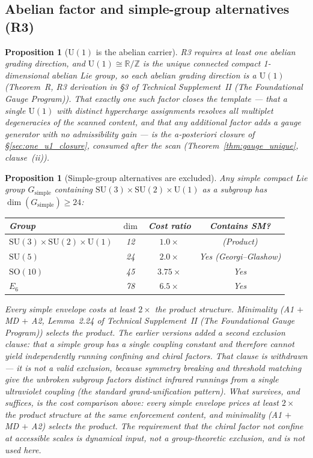 \documentclass[11pt]{article}
\newtheorem{proposition}[theorem]{Proposition}
\theoremstyle{definition}
\newcommand{\SU}{\mathrm{SU}}
\newcommand{\U}{\mathrm{U}}
\newcommand{\TSII}{Technical Supplement~II (\emph{The Foundational Gauge Program})}
\begin{document}
\subsection{Abelian factor and simple-group alternatives (R3)}
\label{sec:R3_simple}

\begin{proposition}[$\U(1)$ is the abelian carrier]\label{prop:R3_unique}
R3 requires at least one abelian grading direction, and
$\U(1) \cong \mathbb{R}/\mathbb{Z}$ is the unique connected compact
1-dimensional abelian Lie group, so each abelian grading direction is
a $\U(1)$ (Theorem~R, R3 derivation in \S3 of \TSII{}).  That
\emph{exactly one} such factor closes the template --- that a single
$\U(1)$ with distinct hypercharge assignments resolves all multiplet
degeneracies of the scanned content, and that any additional factor
adds a gauge generator with no admissibility gain --- is the
a-posteriori closure of \S\ref{sec:one_u1_closure}, consumed after
the scan (Theorem~\ref{thm:gauge_unique}, clause~(ii)).
\end{proposition}

\begin{proposition}[Simple-group alternatives are excluded]\label{prop:no_simple}
Any simple compact Lie group $G_{\mathrm{simple}}$ containing
$\SU(3) \times \SU(2) \times \U(1)$ as a subgroup has
$\dim(G_{\mathrm{simple}}) \ge 24$:

\smallskip
\begin{center}
\small
\begin{tabular}{@{}lccc@{}}
\toprule
\textbf{Group} & $\dim$ & \textbf{Cost ratio} & \textbf{Contains SM?} \\
\midrule
$\SU(3) \times \SU(2) \times \U(1)$ & 12 & $1.0\times$ & (Product) \\
$\SU(5)$   & 24 & $2.0\times$ & Yes (Georgi--Glashow) \\
$\mathrm{SO}(10)$ & 45 & $3.75\times$ & Yes \\
$E_6$ & 78 & $6.5\times$ & Yes \\
\bottomrule
\end{tabular}
\end{center}

\smallskip\noindent Every simple envelope costs at least $2\times$ the
product structure.  Minimality (A1 $+$ MD $+$ A2,
Lemma~2.24 of \TSII{}) selects the product.
The earlier versions added a second exclusion clause: that a simple
group has a single coupling constant and therefore cannot yield
independently running confining and chiral factors.  That clause is
withdrawn --- it is not a valid exclusion, because symmetry breaking
and threshold matching give the unbroken subgroup factors distinct
infrared runnings from a single ultraviolet coupling (the standard
grand-unification pattern).  What survives, and suffices, is the cost
comparison above: every simple envelope prices at least $2\times$ the
product structure at the same enforcement content, and minimality
(A1 $+$ MD $+$ A2) selects the product.  The requirement that the
chiral factor not confine at accessible scales is dynamical input, not
a group-theoretic exclusion, and is not used here.
\end{proposition}
\end{document}
